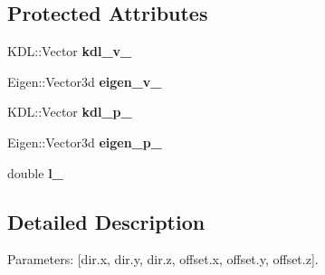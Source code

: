 \subsection*{Protected Attributes}
\begin{DoxyCompactItemize}
\item 
\hypertarget{classhiqp_1_1geometric__primitives_1_1GeometricLine_ad55d98c54189b4c91e2e968d7daf123d}{K\-D\-L\-::\-Vector {\bfseries kdl\-\_\-v\-\_\-}}\label{classhiqp_1_1geometric__primitives_1_1GeometricLine_ad55d98c54189b4c91e2e968d7daf123d}

\item 
\hypertarget{classhiqp_1_1geometric__primitives_1_1GeometricLine_aa84ecd396066feff7b3290b7c7178e32}{Eigen\-::\-Vector3d {\bfseries eigen\-\_\-v\-\_\-}}\label{classhiqp_1_1geometric__primitives_1_1GeometricLine_aa84ecd396066feff7b3290b7c7178e32}

\item 
\hypertarget{classhiqp_1_1geometric__primitives_1_1GeometricLine_a650defd742193255dc40eff0d3ff811f}{K\-D\-L\-::\-Vector {\bfseries kdl\-\_\-p\-\_\-}}\label{classhiqp_1_1geometric__primitives_1_1GeometricLine_a650defd742193255dc40eff0d3ff811f}

\item 
\hypertarget{classhiqp_1_1geometric__primitives_1_1GeometricLine_a56edbb80b40cfd1e672831bd9a637d44}{Eigen\-::\-Vector3d {\bfseries eigen\-\_\-p\-\_\-}}\label{classhiqp_1_1geometric__primitives_1_1GeometricLine_a56edbb80b40cfd1e672831bd9a637d44}

\item 
\hypertarget{classhiqp_1_1geometric__primitives_1_1GeometricLine_a2a8da9d7906a8a499f280295345468b5}{double {\bfseries l\-\_\-}}\label{classhiqp_1_1geometric__primitives_1_1GeometricLine_a2a8da9d7906a8a499f280295345468b5}

\end{DoxyCompactItemize}


\subsection{Detailed Description}
Parameters\-: \mbox{[}dir.\-x, dir.\-y, dir.\-z, offset.\-x, offset.\-y, offset.\-z\mbox{]}. 

